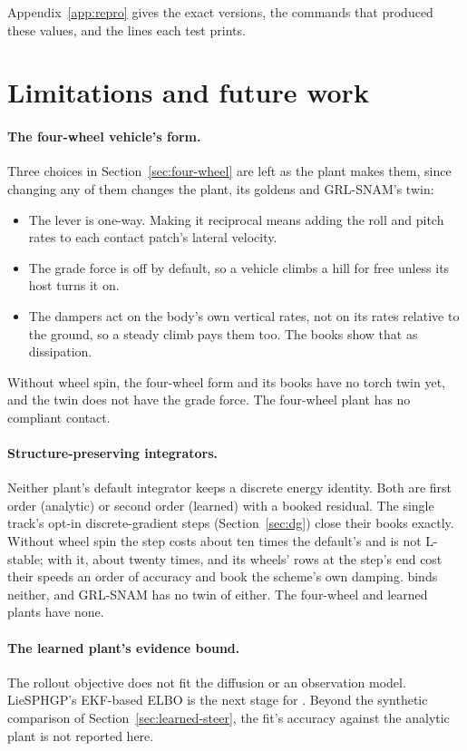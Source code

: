\documentclass[11pt]{article}
\theoremstyle{remark}
\begin{document}
Appendix~\ref{app:repro} gives the exact versions, the commands that produced these values, and
the lines each test prints.

\clearpage
\section{Limitations and future work}
\label{sec:limits}

\paragraph{The four-wheel vehicle's form.} Three choices in Section~\ref{sec:four-wheel} are left
as the plant makes them, since changing any of them changes the plant, its goldens and GRL-SNAM's
 twin:
\begin{itemize}
  \item The lever is one-way. Making it reciprocal means adding the roll and pitch rates to each
        contact patch's lateral velocity.
  \item The grade force is off by default, so a vehicle climbs a hill for free unless its host
        turns it on.
  \item The dampers act on the body's own vertical rates, not on its rates relative to the ground,
        so a steady climb pays them too. The books show that as dissipation.
\end{itemize}
Without wheel spin, the four-wheel form and its books have no torch twin yet, and the twin does not
have the grade force. The four-wheel plant has no compliant contact.

\paragraph{Structure-preserving integrators.} Neither plant's default integrator keeps a discrete
energy identity. Both are first order (analytic) or second order (learned) with a booked residual.
The single track's opt-in discrete-gradient steps (Section~\ref{sec:dg}) close their books
exactly. Without wheel spin the step costs about ten times the default's and is not L-stable; with
it, about twenty times, and its wheels' rows at the step's end cost their speeds an order of
accuracy and book the scheme's own damping.  binds neither, and GRL-SNAM has no twin
of either. The four-wheel and learned plants have none.

\paragraph{The learned plant's evidence bound.} The rollout objective does not fit the diffusion or
an observation model. LieSPHGP's EKF-based ELBO is the next stage for . Beyond the
synthetic comparison of Section~\ref{sec:learned-steer}, the fit's accuracy against the analytic
plant is not reported here.
\end{document}

